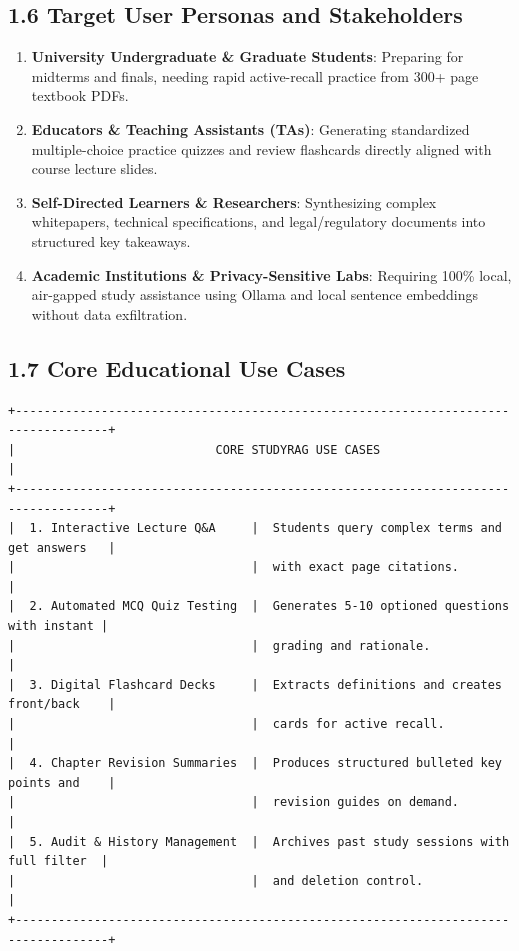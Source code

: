 \documentclass[
]{article}
\providecommand{\tightlist}{%
  \setlength{\itemsep}{0pt}\setlength{\parskip}{0pt}}
\begin{document}
\subsection{1.6 Target User Personas and
Stakeholders}\label{target-user-personas-and-stakeholders}

\begin{enumerate}
\def\labelenumi{\arabic{enumi}.}
\tightlist
\item
  \textbf{University Undergraduate \& Graduate Students}: Preparing for
  midterms and finals, needing rapid active-recall practice from 300+
  page textbook PDFs.
\item
  \textbf{Educators \& Teaching Assistants (TAs)}: Generating
  standardized multiple-choice practice quizzes and review flashcards
  directly aligned with course lecture slides.
\item
  \textbf{Self-Directed Learners \& Researchers}: Synthesizing complex
  whitepapers, technical specifications, and legal/regulatory documents
  into structured key takeaways.
\item
  \textbf{Academic Institutions \& Privacy-Sensitive Labs}: Requiring
  100\% local, air-gapped study assistance using Ollama and local
  sentence embeddings without data exfiltration.
\end{enumerate}

\subsection{1.7 Core Educational Use
Cases}\label{core-educational-use-cases}

\begin{verbatim}
+-----------------------------------------------------------------------------------+
|                            CORE STUDYRAG USE CASES                                |
+-----------------------------------------------------------------------------------+
|  1. Interactive Lecture Q&A     |  Students query complex terms and get answers   |
|                                 |  with exact page citations.                     |
|  2. Automated MCQ Quiz Testing  |  Generates 5-10 optioned questions with instant |
|                                 |  grading and rationale.                         |
|  3. Digital Flashcard Decks     |  Extracts definitions and creates front/back    |
|                                 |  cards for active recall.                       |
|  4. Chapter Revision Summaries  |  Produces structured bulleted key points and    |
|                                 |  revision guides on demand.                     |
|  5. Audit & History Management  |  Archives past study sessions with full filter  |
|                                 |  and deletion control.                          |
+-----------------------------------------------------------------------------------+
\end{verbatim}
\end{document}
